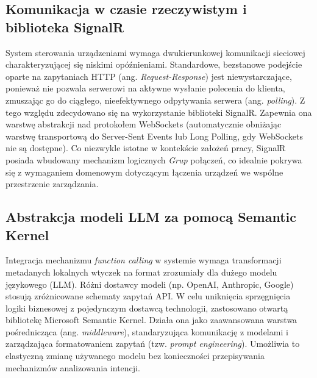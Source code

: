 \subsection{Komunikacja w czasie rzeczywistym i biblioteka SignalR}
\label{subsec:signalr}
System sterowania urządzeniami wymaga dwukierunkowej komunikacji sieciowej charakteryzującej się niskimi opóźnieniami. Standardowe, bezstanowe podejście oparte na zapytaniach HTTP (ang. \textit{Request-Response}) jest niewystarczające, ponieważ nie pozwala serwerowi na aktywne wysłanie polecenia do klienta, zmuszając go do ciągłego, nieefektywnego odpytywania serwera (ang. \textit{polling}). Z tego względu zdecydowano się na wykorzystanie biblioteki SignalR. Zapewnia ona warstwę abstrakcji nad protokołem WebSockets (automatycznie obniżając warstwę transportową do Server-Sent Events lub Long Polling, gdy WebSockets nie są dostępne). Co niezwykle istotne w kontekście założeń pracy, SignalR posiada wbudowany mechanizm logicznych \textit{Grup} połączeń, co idealnie pokrywa się z wymaganiem domenowym dotyczącym łączenia urządzeń we wspólne przestrzenie zarządzania.

\subsection{Abstrakcja modeli LLM za pomocą Semantic Kernel}
\label{subsec:semantic_kernel}
Integracja mechanizmu \textit{function calling} w systemie wymaga transformacji metadanych lokalnych wtyczek na format zrozumiały dla dużego modelu językowego (LLM). Różni dostawcy modeli (np. OpenAI, Anthropic, Google) stosują zróżnicowane schematy zapytań API. W celu uniknięcia sprzęgnięcia logiki biznesowej z pojedynczym dostawcą technologii, zastosowano otwartą bibliotekę Microsoft Semantic Kernel. Działa ona jako zaawansowana warstwa pośrednicząca (ang. \textit{middleware}), standaryzująca komunikację z modelami i zarządzająca formatowaniem zapytań (tzw. \textit{prompt engineering}). Umożliwia to elastyczną zmianę używanego modelu bez konieczności przepisywania mechanizmów analizowania intencji.

